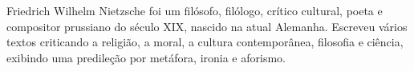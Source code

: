 Friedrich Wilhelm Nietzsche foi um filósofo, filólogo, crítico cultural, poeta e 
compositor prussiano do século XIX, nascido na atual Alemanha. Escreveu vários 
textos criticando a religião, a moral, a cultura contemporânea, filosofia e 
ciência, exibindo uma predileção por metáfora, ironia e aforismo.
